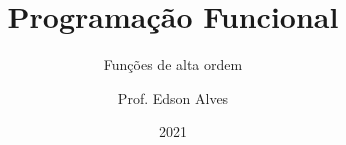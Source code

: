 \title{Programação Funcional}
\subtitle{Funções de alta ordem}
\date{2021}
\author{Prof. Edson Alves}
